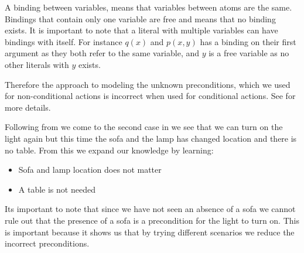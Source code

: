 \documentclass[\master/Master.tex]{subfiles}
\begin{document}
\begin{definition}[Binding]\label{def:ca:binding}
    A binding between variables, means that variables between atoms are the same.
	Bindings that contain only one variable are free and means that no binding exists.
	It is important to note that a literal with multiple variables can have bindings with itself.
	For instance $q(x)$ and $p(x,y)$ has a binding on their first argument as they both refer to the same variable, and $y$ is a free variable as no other literals with $y$ exists.
\end{definition}
Therefore the approach to modeling the unknown preconditions, which we used for non-conditional actions is incorrect when used for conditional actions. See  for more details.

\begin{example}\label{ex:ca:light-on-2}
    Following from  we come to the second case in 
    we see that we can turn on the light again but this time the sofa and the lamp has changed location and
    there is no table. From this we expand our knowledge by learning:
    \begin{itemize}
        \item Sofa and lamp location does not matter
        \item A table is not needed
    \end{itemize}
    Its important to note that since we have not seen an absence of a sofa we cannot rule out that the presence of a sofa is a precondition for the light to turn on. This is important because it shows us that by trying different scenarios we reduce the incorrect preconditions.
\end{example}
\end{document}
